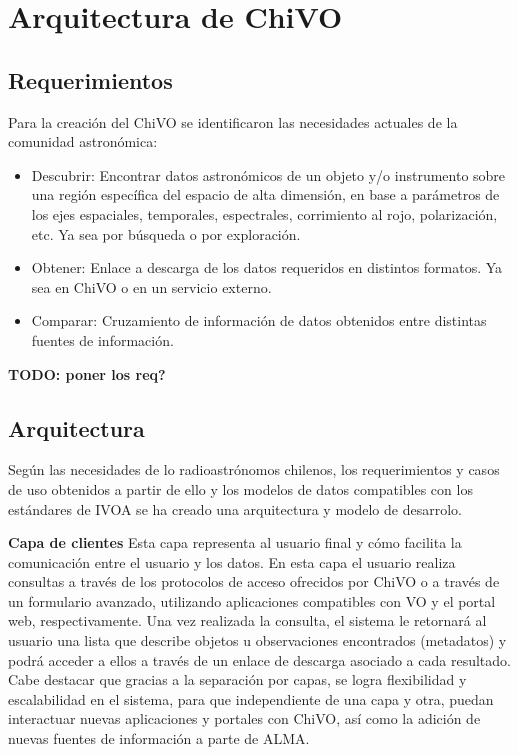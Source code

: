 \section{Arquitectura de ChiVO}
\subsection{Requerimientos}
Para la creación del ChiVO se identificaron las necesidades actuales de la comunidad astronómica:
\begin{itemize} 
 \item Descubrir: Encontrar datos astronómicos de un objeto y/o instrumento sobre una región específica del espacio de alta dimensión, en base a parámetros de los ejes espaciales, temporales, espectrales, corrimiento al rojo, polarización, etc. Ya sea por búsqueda o por exploración.
 \item Obtener: Enlace a descarga de los datos requeridos en distintos formatos. Ya sea en ChiVO o en un servicio externo.
 \item Comparar: Cruzamiento de información de datos obtenidos entre distintas fuentes de información.
\end{itemize}

\textbf{TODO: poner los req?}

\subsection{Arquitectura}
Según las necesidades de lo radioastrónomos chilenos, los requerimientos y casos de uso obtenidos a partir de ello y los modelos de datos compatibles con los estándares de IVOA se ha creado una arquitectura y modelo de desarrolo.


\textbf{Capa de clientes}
Esta capa representa al usuario final y cómo facilita la comunicación entre el usuario y los datos. En esta capa el usuario realiza consultas a través de los protocolos de acceso ofrecidos por ChiVO o a través de un formulario avanzado, utilizando aplicaciones compatibles con VO y el portal web, respectivamente. Una vez realizada la consulta, el sistema le retornará al usuario una lista que describe objetos u observaciones encontrados (metadatos) y podrá acceder a ellos a través de un enlace de descarga asociado a cada resultado.
Cabe destacar que gracias a la separación por capas, se logra flexibilidad y escalabilidad en el sistema, para que independiente de una capa y otra, puedan interactuar nuevas aplicaciones y portales con ChiVO, así como la adición de nuevas fuentes de información a parte de ALMA.

